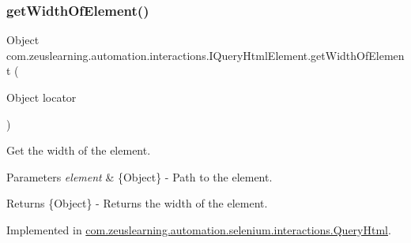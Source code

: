 \hypertarget{interfacecom_1_1zeuslearning_1_1automation_1_1interactions_1_1IQueryHtmlElement_a6edc78d4dfd12bb3e9bdbc67c9abdff3}{}\label{interfacecom_1_1zeuslearning_1_1automation_1_1interactions_1_1IQueryHtmlElement_a6edc78d4dfd12bb3e9bdbc67c9abdff3} 
\subsubsection{\texorpdfstring{get\+Width\+Of\+Element()}{getWidthOfElement()}}
{\footnotesize\ttfamily Object com.\+zeuslearning.\+automation.\+interactions.\+I\+Query\+Html\+Element.\+get\+Width\+Of\+Element (\begin{DoxyParamCaption}\item[{Object}]{locator }\end{DoxyParamCaption})}

Get the width of the element.


\begin{DoxyParams}{Parameters}
{\em element} & \{Object\} -\/ Path to the element. \\
\hline
\end{DoxyParams}
\begin{DoxyReturn}{Returns}
\{Object\} -\/ Returns the width of the element. 
\end{DoxyReturn}


Implemented in \hyperlink{classcom_1_1zeuslearning_1_1automation_1_1selenium_1_1interactions_1_1QueryHtml_a8e93f8a477d39f58357ab540e4ef78c1}{com.\+zeuslearning.\+automation.\+selenium.\+interactions.\+Query\+Html}.

\hypertarget{interfacecom_1_1zeuslearning_1_1automation_1_1interactions_1_1IQueryHtmlElement_a5c04301a20d28108814175e83ea6e939}{}\label{interfacecom_1_1zeuslearning_1_1automation_1_1interactions_1_1IQueryHtmlElement_a5c04301a20d28108814175e83ea6e939} 
